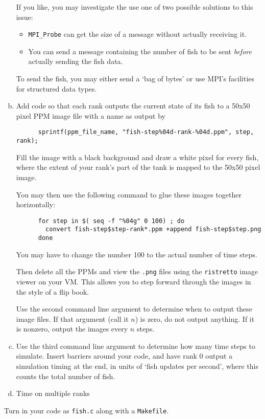 \documentclass[11pt]{article}
\begin{document}
\begin{enumerate}[a)]
    If you like, you may investigate the use one of two possible
    solutions to this issue:
    \begin{itemize}
      \item \texttt{MPI\_Probe} can get the size of a message without
        actually receiving it.
      \item You can send a message containing the number of fish to be
        sent \emph{before} actually sending the fish data.
    \end{itemize}
    To send the fish, you may either send a `bag of bytes' or use
    MPI's facilities for structured data types.

  \item Add code so that each rank outputs the current state of its
    fish to a 50x50 pixel PPM image file with a name as output by
    \begin{lstlisting}
      sprintf(ppm_file_name, "fish-step%04d-rank-%04d.ppm", step, rank);
    \end{lstlisting}
    Fill the image with a black background and draw a white pixel for
    every fish, where the extent of your rank's part of the tank is
    mapped to the 50x50 pixel image.

    You may then use the following command to glue these images
    together horizontally:
    \begin{lstlisting}
      for step in $( seq -f "%04g" 0 100) ; do
        convert fish-step$step-rank*.ppm +append fish-step$step.png
      done
    \end{lstlisting}%
    You may have to change the number 100 to the actual number of time
    steps.

    Then delete all the PPMs and view the \texttt{.png} files using
    the \texttt{ristretto} image viewer on your VM. This allows you to
    step forward through the images in the style of a flip book.

    Use the second command line argument to determine when to output
    these image files. If that argument (call it $n$) is zero, do not
    output anything.  If it is nonzero, output the images every $n$
    steps.

  \item Use the third command line argument to determine how many time
    steps to simulate. Insert barriers around your code, and have 
    rank 0 output a simulation timing at the end, in units of `fish
    updates per second', where this counts the total number of fish.

  \item %
    Time on multiple ranks
\end{enumerate}
Turn in your code as \texttt{fish.c} along with a \texttt{Makefile}.
\end{document}
